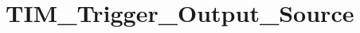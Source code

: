 \hypertarget{group___t_i_m___trigger___output___source}{\section{T\-I\-M\-\_\-\-Trigger\-\_\-\-Output\-\_\-\-Source}
\label{group___t_i_m___trigger___output___source}
}
